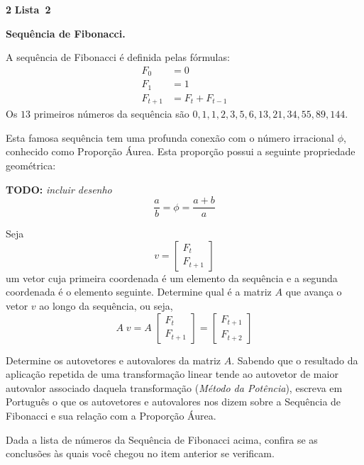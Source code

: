 \documentclass{article}
\newenvironment{question}
    {\medskip\bfseries\large}
    {\medskip}
\newcounter{exe-list}
\newenvironment{exe-list}
    {\begin{list}{(\alph{exe-list})}{\usecounter{exe-list}}}
    {\end{list}}
\newenvironment{exe}[2][Sala]
    {\bigskip\noindent\par\ifthenelse{\equal{#1}{}}%
        {\textbf{\LARGE #2}}%
        {\textbf{\LARGE #1~#2}}%
    \medskip\noindent\par}
    {\bigskip}
\newcommand{\todo}[1]{\textbf{TODO:} {\itshape #1}}
\begin{document}
\begin{exe}[Lista]{2}
    \begin{question}
        Sequência de Fibonacci. \medskip\noindent\par
        A sequência de Fibonacci
        é definida pelas fórmulas:
        \begin{align*}
            F_0 &= 0 \\
            F_1 &= 1 \\
            F_{t+1} &= F_t + F_{t-1}
        \end{align*}
        Os \(13\) primeiros números da sequência são
        \(0, 1, 1, 2, 3, 5, 6, 13, 21, 34, 55, 89, 144\).

        Esta famosa sequência tem uma profunda conexão
        com o número irracional \(\phi\),
        conhecido como Proporção Áurea.
        Esta proporção possui a seguinte propriedade geométrica:

        \todo{incluir desenho}
        \[
            \frac{a}{b} = \phi = \frac{a+b}{a}
        \]
        \begin{exe-list}
            \item
                Seja
                \[
                    v = \begin{bmatrix}
                        F_t \\ F_{t+1}
                    \end{bmatrix}
                \]
                um vetor cuja primeira coordenada é
                um elemento da sequência e
                a segunda coordenada é o elemento seguinte.
                Determine qual é a matriz \(A\) que
                avança o vetor \(v\) ao longo da sequência,
                ou seja,
                \[
                    A \; v
                    = A \; \begin{bmatrix}
                        F_t \\ F_{t+1}
                    \end{bmatrix}
                    = \begin{bmatrix}
                        F_{t+1} \\ F_{t+2}
                    \end{bmatrix}
                \]
            \item
                Determine os autovetores e autovalores
                da matriz \(A\).
                Sabendo que o resultado da aplicação repetida
                de uma transformação linear
                tende ao autovetor de maior autovalor associado
                daquela transformação
                (\emph{Método da Potência}),
                escreva em Português o que
                os autovetores e autovalores nos dizem
                sobre a Sequência de Fibonacci e
                sua relação com a Proporção Áurea.
            \item
                Dada a lista de números
                da Sequência de Fibonacci acima,
                confira se as conclusões às quais você chegou
                no item anterior se verificam.
        \end{exe-list}
    \end{question}
\end{exe}
\end{document}
